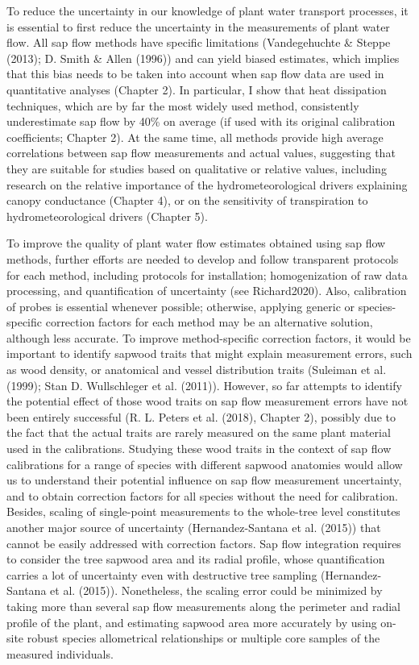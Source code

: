 \documentclass[11pt,twoside]{reedthesis}
\begin{document}
To reduce the uncertainty in our knowledge of plant water transport
processes, it is essential to first reduce the uncertainty in the
measurements of plant water flow. All sap flow methods have specific
limitations (Vandegehuchte \& Steppe (2013); D. Smith \& Allen (1996))
and can yield biased estimates, which implies that this bias needs to be
taken into account when sap flow data are used in quantitative analyses
(Chapter 2). In particular, I show that heat dissipation techniques,
which are by far the most widely used method, consistently underestimate
sap flow by 40\% on average (if used with its original calibration
coefficients; Chapter 2). At the same time, all methods provide high
average correlations between sap flow measurements and actual values,
suggesting that they are suitable for studies based on qualitative or
relative values, including research on the relative importance of the
hydrometeorological drivers explaining canopy conductance (Chapter 4),
or on the sensitivity of transpiration to hydrometeorological drivers
(Chapter 5). \par

To improve the quality of plant water flow estimates obtained using sap
flow methods, further efforts are needed to develop and follow
transparent protocols for each method, including protocols for
installation; homogenization of raw data processing, and quantification
of uncertainty (see Richard2020). Also, calibration of probes is
essential whenever possible; otherwise, applying generic or
species-specific correction factors for each method may be an
alternative solution, although less accurate. To improve method-specific
correction factors, it would be important to identify sapwood traits
that might explain measurement errors, such as wood density, or
anatomical and vessel distribution traits (Suleiman et al. (1999); Stan
D. Wullschleger et al. (2011)). However, so far attempts to identify the
potential effect of those wood traits on sap flow measurement errors
have not been entirely successful (R. L. Peters et al. (2018), Chapter
2), possibly due to the fact that the actual traits are rarely measured
on the same plant material used in the calibrations. Studying these wood
traits in the context of sap flow calibrations for a range of species
with different sapwood anatomies would allow us to understand their
potential influence on sap flow measurement uncertainty, and to obtain
correction factors for all species without the need for calibration.
Besides, scaling of single-point measurements to the whole-tree level
constitutes another major source of uncertainty (Hernandez-Santana et
al. (2015)) that cannot be easily addressed with correction factors. Sap
flow integration requires to consider the tree sapwood area and its
radial profile, whose quantification carries a lot of uncertainty even
with destructive tree sampling (Hernandez-Santana et al. (2015)).
Nonetheless, the scaling error could be minimized by taking more than
several sap flow measurements along the perimeter and radial profile of
the plant, and estimating sapwood area more accurately by using on-site
robust species allometrical relationships or multiple core samples of
the measured individuals.\par
\end{document}
